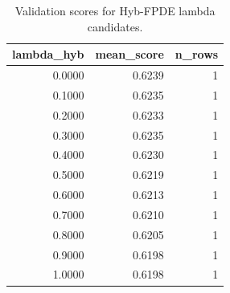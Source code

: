 \begin{table}[t]
\caption{Validation scores for Hyb-FPDE lambda candidates.}
\label{tab:lambda_distribution_computed}
\centering
\begin{tabular}{rrr}
\toprule
lambda\_hyb & mean\_score & n\_rows \\
\midrule
0.0000 & 0.6239 & 1 \\
0.1000 & 0.6235 & 1 \\
0.2000 & 0.6233 & 1 \\
0.3000 & 0.6235 & 1 \\
0.4000 & 0.6230 & 1 \\
0.5000 & 0.6219 & 1 \\
0.6000 & 0.6213 & 1 \\
0.7000 & 0.6210 & 1 \\
0.8000 & 0.6205 & 1 \\
0.9000 & 0.6198 & 1 \\
1.0000 & 0.6198 & 1 \\
\bottomrule
\end{tabular}

\end{table}
